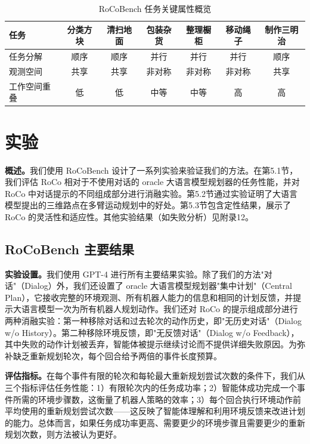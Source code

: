 \documentclass[UTF8, a4paper, 12pt]{article}
\begin{document}
\begin{table}[htbp]
\centering
\caption{RoCoBench 任务关键属性概览}
\begin{tabular}{lcccccc}
\toprule
任务 & 分类方块 & 清扫地面 & 包装杂货 & 整理橱柜 & 移动绳子 & 制作三明治 \\
\midrule
任务分解 & 顺序 & 顺序 & 并行 & 并行 & 并行 & 顺序 \\
观测空间 & 共享 & 共享 & 非对称 & 非对称 & 非对称 & 共享 \\
工作空间重叠 & 低 & 低 & 中等 & 中等 & 高 & 高 \\
\bottomrule
\end{tabular}
\end{table}

\section{实验}

\textbf{概述。}我们使用 RoCoBench 设计了一系列实验来验证我们的方法。在第5.1节，我们评估 RoCo 相对于不使用对话的 oracle 大语言模型规划器的任务性能，并对 RoCo 中对话提示的不同组成部分进行消融实验。第5.2节通过实验证明了大语言模型提出的三维路点在多臂运动规划中的好处。第5.3节包含定性结果，展示了 RoCo 的灵活性和适应性。其他实验结果（如失败分析）见附录12。

\subsection{RoCoBench 主要结果}

\textbf{实验设置。}我们使用 GPT-4 进行所有主要结果实验。除了我们的方法"对话"（Dialog）外，我们还设置了 oracle 大语言模型规划器"集中计划"（Central Plan），它接收完整的环境观测、所有机器人能力的信息和相同的计划反馈，并提示大语言模型一次为所有机器人规划动作。我们还对 RoCo 的提示组成部分进行两种消融实验：第一种移除对话和过去轮次的动作历史，即"无历史对话"（Dialog w/o History）。第二种移除环境反馈，即"无反馈对话"（Dialog w/o Feedback），其中失败的动作计划被丢弃，智能体被提示继续讨论而不提供详细失败原因。为弥补缺乏重新规划轮次，每个回合给予两倍的事件长度预算。

\textbf{评估指标。}在每个事件有限的轮次和每轮最大重新规划尝试次数的条件下，我们从三个指标评估任务性能：1）有限轮次内的任务成功率；2）智能体成功完成一个事件所需的环境步骤数，这衡量了机器人策略的效率；3）每个回合执行环境动作前平均使用的重新规划尝试次数——这反映了智能体理解和利用环境反馈来改进计划的能力。总体而言，如果任务成功率更高、需要更少的环境步骤且需要更少的重新规划次数，则方法被认为更好。
\end{document}
